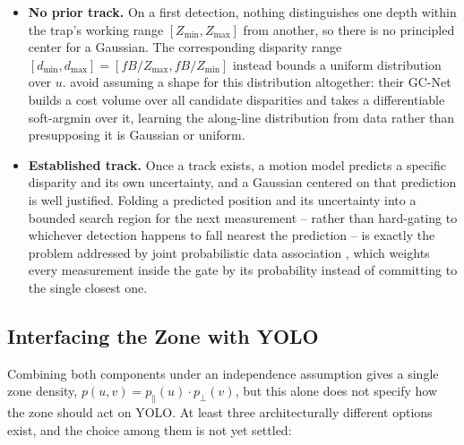 \begin{itemize}
    \item \textbf{No prior track.} On a first detection, nothing
    distinguishes one depth within the trap's working range
    $[Z_{\min}, Z_{\max}]$ from another, so there is no principled center
    for a Gaussian. The corresponding disparity range
    $[d_{\min}, d_{\max}] = [fB/Z_{\max}, fB/Z_{\min}]$ instead bounds a
    uniform distribution over $u$. \textcite{kendall_end-to-end_2017}
    avoid assuming a shape for this distribution altogether: their GC-Net
    builds a cost volume over all candidate disparities and takes a
    differentiable soft-argmin over it, learning the along-line
    distribution from data rather than presupposing it is Gaussian or
    uniform.
    \item \textbf{Established track.} Once a track exists, a motion model
    predicts a specific disparity and its own uncertainty, and a Gaussian
    centered on that prediction is well justified. Folding a predicted
    position and its uncertainty into a bounded search region for the next
    measurement -- rather than hard-gating to whichever detection happens
    to fall nearest the prediction -- is exactly the problem addressed by
    joint probabilistic data association \parencite{fortmann_sonar_1983},
    which weights every measurement inside the gate by its probability
    instead of committing to the single closest one.
\end{itemize}

\subsection{Interfacing the Zone with YOLO}
\label{sec:zone-yolo-interface}

Combining both components under an independence assumption gives a single
zone density, $p(u, v) = p_\parallel(u) \cdot p_\perp(v)$, but this alone
does not specify how the zone should act on YOLO. At least three
architecturally different options exist, and the choice among them is not
yet settled:

